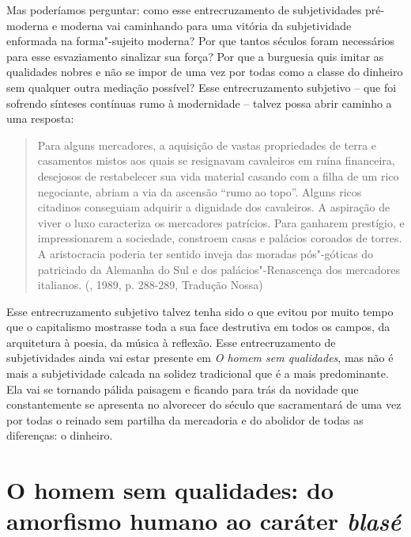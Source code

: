 Mas poderíamos perguntar: como esse entrecruzamento de subjetividades
pré-moderna e moderna vai caminhando para uma vitória da subjetividade
enformada na forma"-sujeito moderna? Por que tantos séculos foram
necessários para esse esvaziamento sinalizar sua força? Por que a
burguesia quis imitar as qualidades nobres e não se impor de uma vez por
todas como a classe do dinheiro sem qualquer outra mediação possível?
Esse entrecruzamento subjetivo -- que foi sofrendo sínteses contínuas
rumo à modernidade -- talvez possa abrir caminho a uma resposta:

\begin{quote}
Para alguns mercadores, a aquisição de vastas propriedades de terra e
casamentos mistos aos quais se resignavam cavaleiros em ruína
financeira, desejosos de restabelecer sua vida material casando com a
filha de um rico negociante, abriam a via da ascensão ``rumo ao topo''.
Alguns ricos citadinos conseguiam adquirir a dignidade dos cavaleiros. A
aspiração de viver o luxo caracteriza os mercadores patrícios. Para
ganharem prestígio, e impressionarem a sociedade, constroem casas e
palácios coroados de torres. A aristocracia poderia ter sentido inveja
das moradas pós"-góticas do patriciado da Alemanha do Sul e dos
palácios"-Renascença dos mercadores italianos. (, 1989, p.
288-289, Tradução Nossa)
\end{quote}

Esse entrecruzamento subjetivo talvez tenha sido o que evitou por muito
tempo que o capitalismo mostrasse toda a sua face destrutiva em todos os
campos, da arquitetura à poesia, da música à reflexão. Esse
entrecruzamento de subjetividades ainda vai estar presente em \emph{O
homem sem qualidades}, mas não é mais a subjetividade calcada na solidez
tradicional que é a mais predominante. Ela vai se tornando pálida
paisagem e ficando para trás da novidade que constantemente se apresenta
no alvorecer do século  que sacramentará de uma vez por todas o
reinado sem partilha da mercadoria e do abolidor de todas as diferenças:
o dinheiro.

\chapter*{O homem sem qualidades: do amorfismo humano ao caráter \emph{blasé}}

